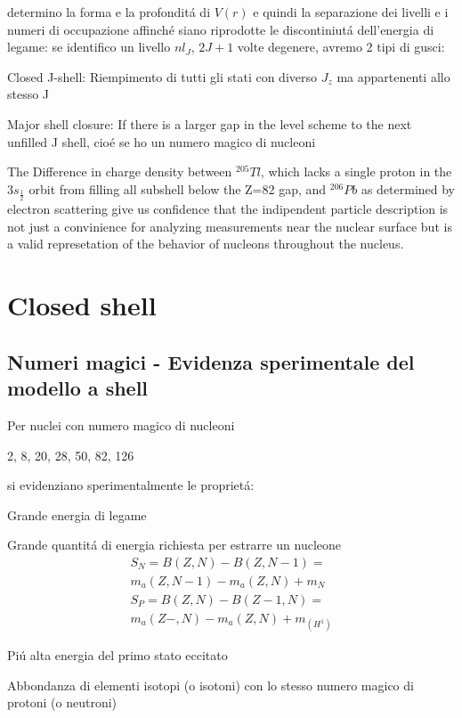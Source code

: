 \documentclass[main.tex]{subfiles}
\begin{document}
determino la forma e la profondit\'a di $V(r)$ e quindi la separazione dei livelli e i numeri di occupazione affinch\'e siano riprodotte le discontiniut\'a dell'energia di legame: se identifico un livello ${nl}_J$, $2J+1$ volte degenere, avremo 2 tipi di gusci:
\begin{enumerate*}
\item Closed J-shell: Riempimento di tutti gli stati con diverso $J_z$ ma appartenenti allo stesso J
\item Major shell closure: If there is a larger gap in the level scheme to the next unfilled J shell, cio\'e se ho un numero magico di nucleoni
\end{enumerate*}



The Difference in charge density between $^{205}Tl$, which lacks a single proton in the $3s_{\frac{1}{2}}$ orbit from filling all subshell below the Z=82 gap, and $^{206}Pb$ as determined by electron scattering give us confidence that the indipendent particle description is not just a convinience for analyzing measurements near the nuclear surface but is a valid represetation of the behavior of nucleons throughout the nucleus.

\section{Closed shell}

\subsection{Numeri magici - Evidenza sperimentale del modello a shell}
Per nuclei con numero magico di nucleoni

2, 8, 20, 28, 50, 82, 126

si evidenziano sperimentalmente le propriet\'a:
\begin{enumerate*}
\item Grande energia di legame
\item Grande quantit\'a di energia richiesta per estrarre un nucleone
\begin{align*}
S_N=B(Z,N)-B(Z,N-1)=\\
m_a(Z,N-1)-m_a(Z,N)+m_N\\
S_P=B(Z,N)-B(Z-1,N)=\\
m_a(Z-,N)-m_a(Z,N)+m_(H^1)
\end{align*}

\item Pi\'u alta energia del primo stato eccitato
\item Abbondanza di elementi isotopi (o isotoni) con lo stesso numero magico di protoni (o neutroni)
\end{enumerate*}
\end{document}
